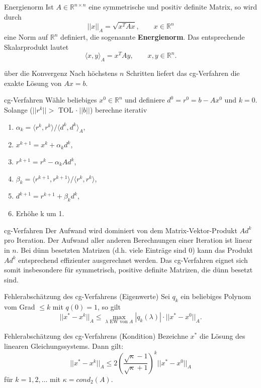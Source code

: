 
\begin{flashcard}[Definition]{Energienorm}
Ist $A \in \mathbb{R}^{n \times n}$ eine symmetrische und positiv definite Matrix, so wird durch
$$||x||_A = \sqrt{x^TAx}, \qquad x \in \mathbb{R}^n$$
eine Norm auf $\mathbb{R}^n$ definiert, die sogenannte \textbf{Energienorm}. Das entsprechende Skalarprodukt lautet
$$\langle x, y \rangle_A = x^TAy, \qquad x,y \in \mathbb{R}^n.$$
\end{flashcard}

\begin{flashcard}[Satz]{über die Konvergenz}
Nach höchstens $n$ Schritten liefert das cg-Verfahren die exakte Lösung von $Ax = b$.
\end{flashcard}

\begin{flashcard}[Algorithmus]{cg-Verfahren}
Wähle beliebiges $x^0 \in \mathbb{R}^n$ und definiere $d^0 = r^0 = b-Ax^0$ und $k=0$.\\
Solange ($||r^k|| >$ TOL $ \cdot \ ||b||$) berechne iterativ
\begin{enumerate}
	\item $\alpha_k = \langle r^k, r^k \rangle /  \langle d^k, d^k \rangle_A$,
	\item $x^{k+1} = x^k + \alpha_k d^k$,
	\item $r^{k+1} = r^k - \alpha_k Ad^k$,
	\item $\beta_k = \langle r^{k+1}, r^{k+1} \rangle / \langle r^k, r^k \rangle$,
	\item $d^{k+1} = r^{k+1} + \beta_k d^k$,
	\item Erhöhe k um 1.
\end{enumerate}
\end{flashcard}

\begin{flashcard}[Aufwand]{cg-Verfahren}
Der Aufwand wird dominiert von dem Matrix-Vektor-Produkt $Ad^k$ pro Iteration. Der Aufwand aller anderen Berechnungen einer Iteration ist linear in $n$. Bei dünn besetzten Matrizen (d.h. viele Einträge sind 0) kann das Produkt $Ad^k$ entsprechend effizienter ausgerechnet werden. Das cg-Verfahren eignet sich somit insbesondere für symmetrisch, positive definite Matrizen, die dünn besetzt sind.
\end{flashcard}

\begin{flashcard}[Satz]{Fehlerabschätzung des cg-Verfahrens (Eigenwerte)}
Sei $q_k$ ein beliebiges Polynom vom Grad $\leq k$ mit $q(0) = 1$, so gilt
$$||x^* - x^k||_A \leq \max_{\lambda \text{ EW von } A} |q_k(\lambda)| \cdot ||x^* - x^0||_A.$$
\end{flashcard}

\begin{flashcard}[Satz]{Fehlerabschätzung des cg-Verfahrens (Kondition)}
Bezeichne $x^*$ die Lösung des linearen Gleichungssystems. Dann gilt:
$$||x^* - x^k||_A \leq 2 \left( \frac{\sqrt{\kappa}-1}{\sqrt{\kappa}+1}\right)^k ||x^* - x^0||_A$$
für $k = 1, 2, \ldots$ mit $\kappa = cond_2(A)$.
\end{flashcard}
